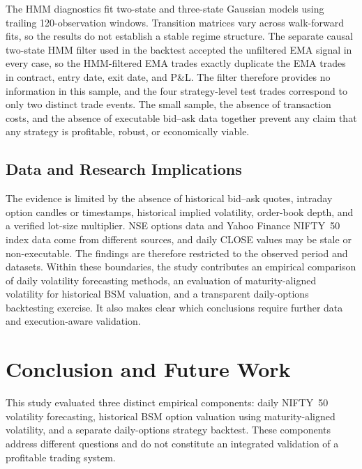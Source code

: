 \documentclass[journal]{IEEEtran}
\begin{document}
The HMM diagnostics fit two-state and three-state Gaussian models using trailing 120-observation windows. Transition matrices vary across walk-forward fits, so the results do not establish a stable regime structure. The separate causal two-state HMM filter used in the backtest accepted the unfiltered EMA signal in every case, so the HMM-filtered EMA trades exactly duplicate the EMA trades in contract, entry date, exit date, and P\&L. The filter therefore provides no information in this sample, and the four strategy-level test trades correspond to only two distinct trade events. The small sample, the absence of transaction costs, and the absence of executable bid--ask data together prevent any claim that any strategy is profitable, robust, or economically viable.

\subsection*{Data and Research Implications}

The evidence is limited by the absence of historical bid--ask quotes, intraday option candles or timestamps, historical implied volatility, order-book depth, and a verified lot-size multiplier. NSE options data and Yahoo Finance NIFTY~50 index data come from different sources, and daily CLOSE values may be stale or non-executable. The findings are therefore restricted to the observed period and datasets. Within these boundaries, the study contributes an empirical comparison of daily volatility forecasting methods, an evaluation of maturity-aligned volatility for historical BSM valuation, and a transparent daily-options backtesting exercise. It also makes clear which conclusions require further data and execution-aware validation.

\section{Conclusion and Future Work}

This study evaluated three distinct empirical components: daily NIFTY~50 volatility forecasting, historical BSM option valuation using maturity-aligned volatility, and a separate daily-options strategy backtest. These components address different questions and do not constitute an integrated validation of a profitable trading system.
\end{document}
